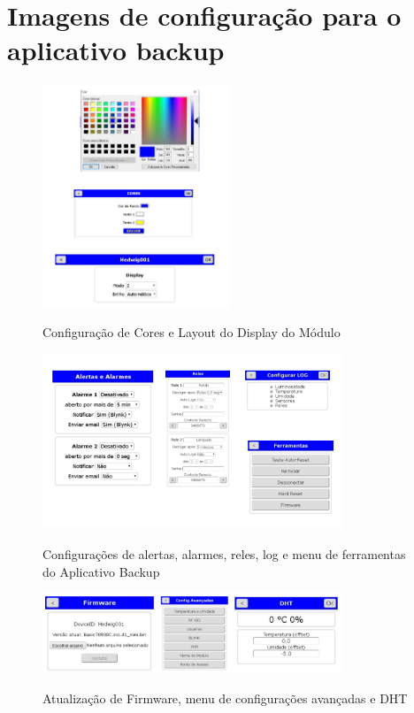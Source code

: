 \chapter{Imagens de configuração para o aplicativo backup}
\label{attachmentsImagensBackup}

\begin{figure}[H]
	\centering
	\caption{Configuração de Cores e Layout do Display do Módulo}
	\includegraphics[width=0.5\textwidth]{configCoresLayoutAppBackup}
	\label{fig:configCoresLayoutAppBackups}
\end{figure}

\begin{figure}[H]
	\centering
	\caption{Configurações de alertas, alarmes, reles, log e menu de ferramentas do Aplicativo Backup}
	\includegraphics[width=0.8\textwidth]{configalertasreleslogferramentas}
	\label{fig:configalertasreleslogferramentas}
\end{figure}

\begin{figure}[H]
	\centering
	\caption{Atualização de Firmware, menu de configurações avançadas e DHT}
	\includegraphics[width=0.8\textwidth]{firmwareconfigavancadasDHT}
	\label{fig:firmwareconfigavancadasDHT}
\end{figure}

